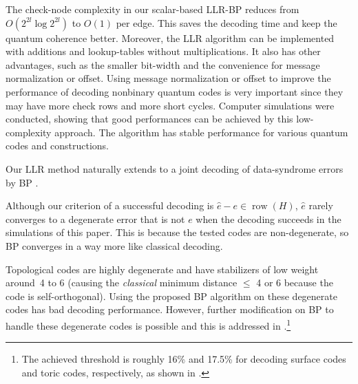 \documentclass{ieeeaccess}
\DeclareMathOperator{\GF}{GF}
\DeclareMathOperator{\row}{row}
\let\emph\textit
\theoremstyle{definition}		%
\newcommand{\rmark}[1]{{\color{red} #1}}
\begin{document}
%
The check-node complexity in our scalar-based LLR-BP reduces from $O(2^{2l}\log 2^{2l})$ to $O(1)$ per edge.
This saves the decoding time and keep the quantum coherence better.
%
Moreover, the LLR algorithm can be implemented with additions and lookup-tables without multiplications. 
It also has other advantages, such as the smaller bit-width and the convenience for message normalization or offset.
%
Using message normalization or offset to improve the performance of decoding nonbinary quantum codes is very important since they may have more check rows and more short cycles.
Computer simulations were conducted, showing that good performances can be achieved by this low-complexity approach.
%
The algorithm has stable performance for various quantum codes and constructions. %
%


Our LLR method naturally extends to a joint decoding of data-syndrome errors by BP \cite{KCL21}.

 

Although our criterion of a successful decoding is $\hat e - e \in \row(H)$, $\hat e$ rarely converges to a degenerate error that is not $e$ when the decoding succeeds in the simulations of this paper. This is because the tested codes are non-degenerate, so BP converges in a way more like classical decoding.

Topological codes are highly degenerate and have stabilizers of low weight around~4 to 6 \cite{Kit03,BM06}
(causing the \emph{classical} minimum distance $\le$ 4 or 6 because the code is self-orthogonal).
Using the proposed BP algorithm on these degenerate codes %
has bad decoding performance.
However, further modification on BP to handle these degenerate codes is possible and this is addressed in \cite{KL21}.\footnote{
	The achieved threshold is roughly 16\% and 17.5\% for decoding surface codes and toric codes, respectively, as shown in \cite[Figs.~14 and~21]{KL21}.
	}
\end{document}
